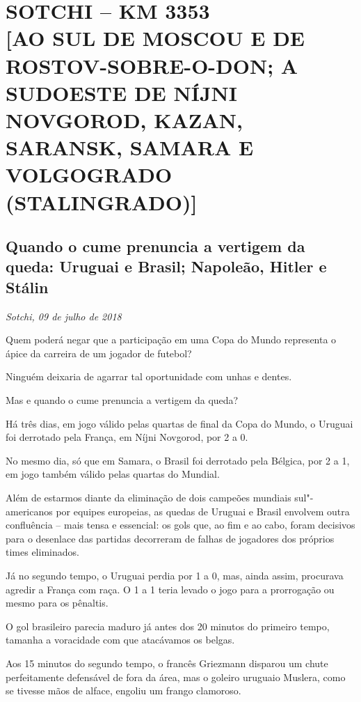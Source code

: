 \movetooddpage
{}
\part*{SOTCHI -- KM 3353\\{[}AO SUL DE MOSCOU E DE ROSTOV-SOBRE-O-DON; A SUDOESTE DE NÍJNI NOVGOROD, KAZAN, SARANSK, SAMARA E VOLGOGRADO (STALINGRADO){]}}

\chapter*{Quando o cume prenuncia a vertigem da queda: Uruguai e Brasil; Napoleão, Hitler e Stálin}

\begin{flushright}
\emph{Sotchi, 09 de julho de 2018}
\end{flushright}

Quem poderá negar que a participação em uma Copa do Mundo representa o
ápice da carreira de um jogador de futebol?

Ninguém deixaria de agarrar tal oportunidade com unhas e dentes.

Mas e quando o cume prenuncia a vertigem da queda?

Há três dias, em jogo válido pelas quartas de final da Copa do Mundo, o
Uruguai foi derrotado pela França, em Níjni Novgorod, por 2 a 0.

No mesmo dia, só que em Samara, o Brasil foi derrotado pela Bélgica, por
2 a 1, em jogo também válido pelas quartas do Mundial.

Além de estarmos diante da eliminação de dois campeões mundiais
sul"-americanos por equipes europeias, as quedas de Uruguai e Brasil
envolvem outra confluência -- mais tensa e essencial: os gols que, ao
fim e ao cabo, foram decisivos para o desenlace das partidas decorreram
de falhas de jogadores dos próprios times eliminados.

Já no segundo tempo, o Uruguai perdia por 1 a 0, mas, ainda assim,
procurava agredir a França com raça. O 1 a 1 teria levado o jogo para a
prorrogação ou mesmo para os pênaltis.

O gol brasileiro parecia maduro já antes dos 20 minutos do primeiro
tempo, tamanha a voracidade com que atacávamos os belgas.

Aos 15 minutos do segundo tempo, o francês Griezmann disparou um chute
perfeitamente defensável de fora da área, mas o goleiro uruguaio
Muslera, como se tivesse mãos de alface, engoliu um frango clamoroso.

